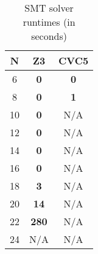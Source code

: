 \begin{table}[H]
\centering
\small
\begin{tabular}{|c|c|c|}
\toprule
\textbf{N} & \textbf{Z3} & \textbf{CVC5} \\
\midrule
6  & \textbf{0}   & \textbf{0}   \\
8  & \textbf{0}   & \textbf{1}   \\
10 & \textbf{0}   & N/A \\
12 & \textbf{0}   & N/A \\
14 & \textbf{0}   & N/A \\
16 & \textbf{0}   & N/A \\
18 & \textbf{3}   & N/A \\
20 & \textbf{14}  & N/A \\
22 & \textbf{280} & N/A \\
24 & N/A & N/A \\
\bottomrule
\end{tabular}
\caption{SMT solver runtimes (in seconds)}
\label{table:smt-result}
\end{table}

